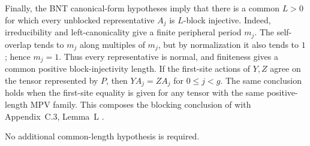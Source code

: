 \begin{lemma}
    Finally, the BNT canonical-form hypotheses imply that there is a common
    $L>0$ for which every unblocked representative $A_j$ is $L$-block
    injective. Indeed, irreducibility and left-canonicality give a finite
    peripheral period $m_j$. The self-overlap tends to $m_j$ along multiples
    of $m_j$, but by normalization it also tends to $1$; hence $m_j=1$.
    Thus every representative is normal, and finiteness gives a common
    positive block-injectivity length. If the first-site actions
    of $Y,Z$ agree on the tensor represented by $P$, then
    $YA_j=ZA_j$ for $0\leq j<g$.
    The same conclusion holds when the first-site equality is given for any
    tensor with the same positive-length MPV family. This composes the blocking
    conclusion of \cite[lines~318--345]{Cirac2016MPDO_arXiv} with
    Appendix~C.3, Lemma~L
    \cite[lines~1835--1858]{Cirac2016MPDO_arXiv}.

    No additional common-length hypothesis is required.
\end{lemma}

